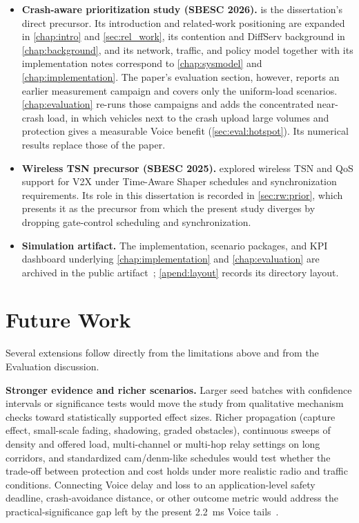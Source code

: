 \begin{itemize}[leftmargin=2em]
  \item \textbf{Crash-aware prioritization study (SBESC 2026).} \textcite{aguiar2026crash} is the dissertation's direct precursor. Its introduction and related-work positioning are expanded in \autoref{chap:intro} and \autoref{sec:rel_work}, its contention and DiffServ background in \autoref{chap:background}, and its network, traffic, and policy model together with its implementation notes correspond to \autoref{chap:sysmodel} and \autoref{chap:implementation}. The paper's evaluation section, however, reports an earlier measurement campaign and covers only the uniform-load scenarios. \autoref{chap:evaluation} re-runs those campaigns and adds the concentrated near-crash load, in which vehicles next to the crash upload large volumes and protection gives a measurable Voice benefit (\autoref{sec:eval:hotspot}). Its numerical results replace those of the paper.
  \item \textbf{Wireless TSN precursor (SBESC 2025).} \textcite{11288825} explored wireless TSN and QoS support for V2X under Time-Aware Shaper schedules and synchronization requirements. Its role in this dissertation is recorded in \autoref{sec:rw:prior}, which presents it as the precursor from which the present study diverges by dropping gate-control scheduling and synchronization.
  \item \textbf{Simulation artifact.} The implementation, scenario packages, and KPI dashboard underlying \autoref{chap:implementation} and \autoref{chap:evaluation} are archived in the public artifact~\cite{aguiar2026_veins_qos}; \autoref{apend:layout} records its directory layout.
\end{itemize}

\section{Future Work}
\label{sec:conc:future}

Several extensions follow directly from the limitations above and from the Evaluation discussion.

\medskip
\noindent\textbf{Stronger evidence and richer scenarios.}
Larger seed batches with confidence intervals or significance tests would move the study from qualitative mechanism checks toward statistically supported effect sizes.
Richer propagation (capture effect, small-scale fading, shadowing, graded obstacles), continuous sweeps of density and offered load, multi-channel or multi-hop relay settings on long corridors, and standardized \gls{cam}/\gls{denm}-like schedules would test whether the trade-off between protection and cost holds under more realistic radio and traffic conditions.
Connecting Voice delay and loss to an application-level safety deadline, crash-avoidance distance, or other outcome metric would address the practical-significance gap left by the present 2.2~ms Voice tails~\cite{ts22186}.


